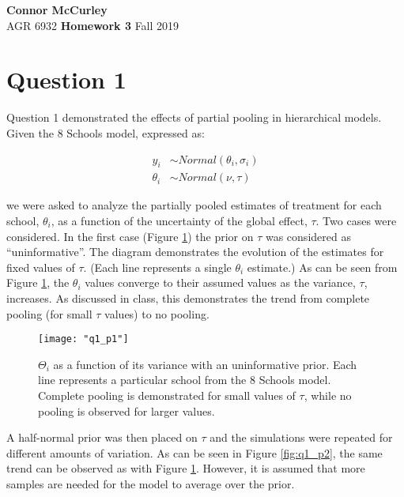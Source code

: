 \documentclass{article}[12 pt]
\begin{document}
	
\begin{center}
	\textbf{\Large Connor McCurley} \\
	AGR 6932  \qquad \quad \quad \textbf{\large Homework 3} \quad \quad \qquad Fall 2019 
\end{center}



\section*{Question 1}
Question 1 demonstrated the effects of partial pooling in hierarchical models.  Given the 8 Schools model, expressed as:

\begin{align*}
	y_i &\sim Normal(\theta_i, \sigma_i) \\
	\theta_i &\sim Normal(\nu, \tau)
\end{align*}

\noindent
we were asked to analyze the partially pooled estimates of treatment for each school, $\theta_i$, as a function of the uncertainty of the global effect, $\tau$. Two cases were considered.  In the first case (Figure \ref{fig:q1_p1}) the prior on $\tau$ was considered as ``uninformative''.  The diagram demonstrates the evolution of the estimates for fixed values of $\tau$.  (Each line represents a single $\theta_i$ estimate.)  As can be seen from Figure \ref{fig:q1_p1}, the $\theta_i$ values converge to their assumed values as the variance, $\tau$, increases.  As discussed in class, this demonstrates the trend from complete pooling (for small $\tau$ values) to no pooling.

\begin{center}
	\begin{figure}[H]
		\centering
		\texttt{[image: "q1\_p1"]}
		\caption{$\Theta_i$ as a function of its variance with an uninformative prior.  Each line represents a particular school from the 8 Schools model.  Complete pooling is demonstrated for small values of $\tau$, while no pooling is observed for larger values.}
		\label{fig:q1_p1}
	\end{figure}
\end{center}

\noindent
A half-normal prior was then placed on $\tau$ and the simulations were repeated for different amounts of variation.  As can be seen in Figure \ref{fig:q1_p2}, the same trend can be observed as with Figure \ref{fig:q1_p1}.  However, it is assumed that more samples are needed for the model to average over the prior.
\end{document}
